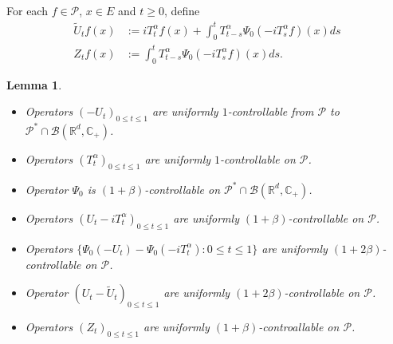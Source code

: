 \documentclass[12pt,oneside,english]{amsart}
\theoremstyle{plain}
\newtheorem{lem}[thm]{Lemma}
\theoremstyle{definition}
\numberwithin{equation}{section}
\newcommand{\added}[1]{{\color{blue}#1}}\newcommand{\deleted}[1]{{\color{red}#1}}
\begin{document}
\subsection{}
\added{
    For each $f \in \mathcal{P}$, $x\in E$ and $t\geq 0$, define
\begin{align}
\label{eq: def of Zf}
    \tilde U_t f(x)
    &:= i T^\alpha_t f(x) + \int_0^t T^\alpha_{t-s} \Psi_0(-i T_s^{\alpha}f)(x)ds
    \\Z_t f (x)
    &:= \int_0^t T^\alpha_{t-s} \Psi_0(-i T_s^{\alpha}f)(x)ds.
\end{align}
}
\added{
\begin{lem}
\label{lem: upper bound for usgx} 
$~$
\begin{itemize}
\item[(1)]
    Operators $(-U_t)_{0\leq t\leq 1}$ are uniformly $1$-controllable from $\mathcal P$ to $\mathcal P^*\cap \mathcal B(\mathbb R^d, \mathbb C_+)$. 
\item[(2)]
    Operators $(T^\alpha_t)_{0\leq t\leq 1}$ are uniformly $1$-controllable on $\mathcal P$.
\item[(3)]
    Operator $\Psi_0$ is $(1+\beta)$-controllable on $\mathcal P^* \cap \mathcal B(\mathbb R^d, \mathbb C_+)$.
\item[(4)]
    Operators $(U_t- iT_t^{\alpha})_{0\leq t\leq 1}$ are uniformly $(1+\beta)$-controllable on $\mathcal P$.
\item[(5)]
    Operators $\{\Psi_0(-U_t) - \Psi_0(-iT_t^\alpha): 0\leq t\leq 1\}$ are uniformly $(1+2\beta)$-controllable on $\mathcal P$.
\item[(6)]
    Operator $(U_t-\tilde U_t)_{0\leq t\leq 1}$ are uniformly $(1+2\beta)$-controllable on $\mathcal P$.
\item[(7)]
    Operators $(Z_t)_{0\leq t\leq 1}$ are uniformly $(1+\beta)$-controallable on $\mathcal P$.
\end{itemize}
\end{lem}
}
\end{document}
